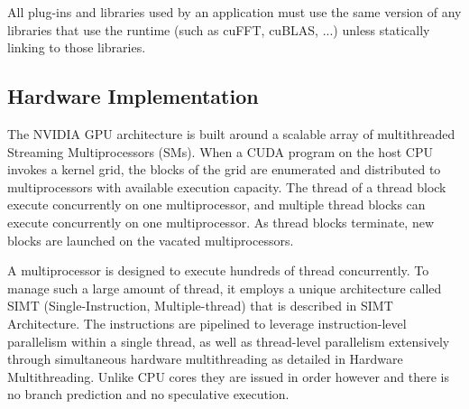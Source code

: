 \documentclass[openany]{book}
\begin{document}
All plug-ins and libraries used by an application must use the same version of 
any libraries that use the runtime (such as cuFFT, cuBLAS, ...) unless 
statically linking to those libraries.



\subsection{Hardware Implementation}%
The NVIDIA GPU architecture is built around a scalable array of multithreaded 
Streaming Multiprocessors (SMs). When a CUDA program on the host CPU invokes a 
kernel grid, the blocks of the grid are enumerated and distributed to 
multiprocessors with available execution capacity. The thread of 
a thread block execute concurrently on one multiprocessor, and 
multiple thread blocks can execute concurrently on one 
multiprocessor. As thread blocks terminate, new blocks are 
launched on the vacated multiprocessors.

A multiprocessor is designed to execute hundreds of thread 
concurrently. To manage such a large amount of thread, it employs 
a unique architecture called SIMT (Single-Instruction, 
Multiple-thread) that is described in SIMT Architecture. The 
instructions are pipelined to leverage instruction-level parallelism within a 
single thread, as well as thread-level parallelism 
extensively through simultaneous hardware multithreading as detailed in 
Hardware Multithreading. Unlike CPU cores they are issued in order however and 
there is no branch prediction and no speculative execution.
\end{document}
